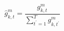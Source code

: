 \begin{equation}
\label{eq:normalized-mask}
{\widehat{g}}_{k,t}^{m}=\frac{{g}_{k,t}^{m}}{\sum _{{t}^{\prime }=1}^{T}{g}_{k,{t}^{\prime }}^{m}}
\end{equation}
